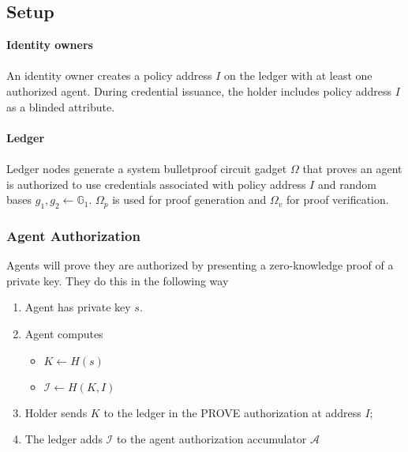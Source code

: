 \documentclass[a4paper]{article}
\begin{document}
\subsection{Setup}
\textbf{Identity owners}\\\\
An identity owner creates a policy address $I$ on the ledger with at least one authorized agent. During credential issuance, the holder includes policy address $I$ as a blinded attribute.\\\\
\textbf{Ledger}\\\\
Ledger nodes generate a system bulletproof circuit gadget $\Omega$ that proves an agent is authorized to use credentials associated with policy address $I$ and random bases $g_1,g_2 \leftarrow \mathbb{G}_1$. $\Omega_p$ is used for proof generation and $\Omega_v$ for proof verification. 
\subsubsection{Agent Authorization}
Agents will prove they are authorized by presenting a zero-knowledge proof of a private key. They do this in the following way
\begin{enumerate}
    \item Agent has private key $s$.
    \item Agent computes 
    \begin{itemize}
        \item $K \leftarrow H(s)$
        \item $\mathcal{I} \leftarrow H(K, I)$
    \end{itemize}
    \item Holder sends $K$ to the ledger in the PROVE authorization at address $I$;
    \item The ledger adds $\mathcal{I}$ to the agent authorization accumulator $\mathcal{A}$
\end{enumerate}
\end{document}
